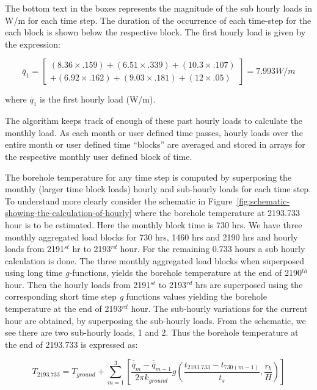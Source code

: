 The bottom text in the boxes represents the magnitude of the sub hourly loads in W/m for each time step. The duration of the occurrence of each time-step for the each block is shown below the respective block. The first hourly load is given by the expression:

\begin{equation}
{\overline q_1} = \left[ \begin{array}{l}\left( {8.36 \times .159} \right) + \left( {6.51 \times .339} \right) + \left( {10.3 \times .107} \right)\\ + \left( {6.92 \times .162} \right) + \left( {9.03 \times .181} \right) + \left( {12 \times .05} \right)\end{array} \right] = 7.993W/m
\end{equation}

where \({\overline q_1}\) is the first hourly load (W/m).

The algorithm keeps track of enough of these past hourly loads to calculate the monthly load. As each month or user defined time passes, hourly loads over the entire month or user defined time ``blocks'' are averaged and stored in arrays for the respective monthly user defined block of time.

The borehole temperature for any time step is computed by superposing the monthly (larger time block loads) hourly and sub-hourly loads for each time step. To understand more clearly consider the schematic in Figure~\ref{fig:schematic-showing-the-calculation-of-hourly} where the borehole temperature at 2193.733 hour is to be estimated. Here the monthly block time is 730 hrs. We have three monthly aggregated load blocks for 730 hrs, 1460 hrs and 2190 hrs and hourly loads from 2191\(^{st}\) hr to 2193\(^{rd}\) hour. For the remaining 0.733 hours a sub hourly calculation is done. The three monthly aggregated load blocks when superposed using long time \emph{g-}functions, yields the borehole temperature at the end of 2190\(^{th}\) hour. Then the hourly loads from 2191\(^{st}\) to 2193\(^{rd}\) hrs are superposed using the corresponding short time step \emph{g} functions values yielding the borehole temperature at the end of 2193\(^{rd}\) hour. The sub-hourly variations for the current hour are obtained, by superposing the sub-hourly loads. From the schematic, we see there are two sub-hourly loads, 1 and 2. Thus the borehole temperature at the end of 2193.733 is expressed as:

\begin{equation}
{T_{2193.733}} = {T_{ground}} + \sum\limits_{m = 1}^3 {\left[ {\frac{{{{\overline{\overline q} }_m} - {{\overline{\overline q} }_{m - 1}}}}{{2\pi {k_{ground}}}}g\left( {\frac{{{t_{2193.733}} - {t_{730(m - 1)}}}}{{{t_s}}},\frac{{{r_b}}}{H}} \right)} \right]}
\end{equation}

